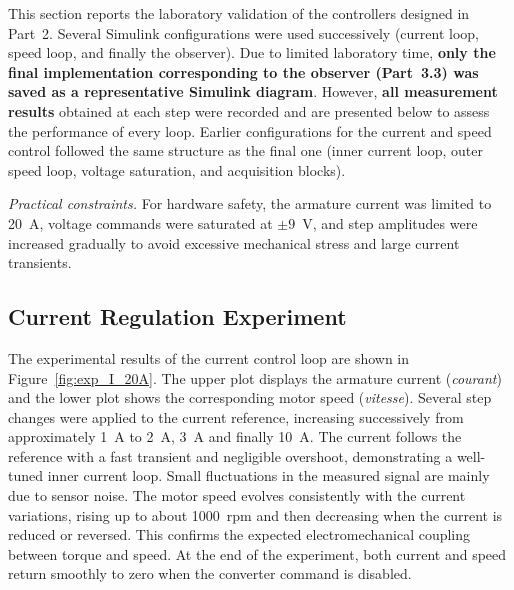 \documentclass{rapportCS}
\begin{document}
\label{sec:exp}

This section reports the laboratory validation of the controllers designed in Part~2. 
Several Simulink configurations were used successively (current loop, speed loop, and finally the observer). 
Due to limited laboratory time, \textbf{only the final implementation corresponding to the observer (Part~3.3) was saved as a representative Simulink diagram}. 
However, \textbf{all measurement results} obtained at each step were recorded and are presented below to assess the performance of every loop. 
Earlier configurations for the current and speed control followed the same structure as the final one (inner current loop, outer speed loop, voltage saturation, and acquisition blocks).

\vspace{4pt}
\noindent\textit{Practical constraints.} For hardware safety, the armature current was limited to 20~A, voltage commands were saturated at $\pm9$~V, and step amplitudes were increased gradually to avoid excessive mechanical stress and large current transients.

\subsection{Current Regulation Experiment}

The experimental results of the current control loop are shown in Figure~\ref{fig:exp_I_20A}. 
The upper plot displays the armature current (\textit{courant}) and the lower plot shows the corresponding motor speed (\textit{vitesse}). 
Several step changes were applied to the current reference, increasing successively from approximately 1~A to 2~A, 3~A and finally 10~A. 
The current follows the reference with a fast transient and negligible overshoot, demonstrating a well-tuned inner current loop. 
Small fluctuations in the measured signal are mainly due to sensor noise. 
The motor speed evolves consistently with the current variations, rising up to about 1000~rpm and then decreasing when the current is reduced or reversed. 
This confirms the expected electromechanical coupling between torque and speed. 
At the end of the experiment, both current and speed return smoothly to zero when the converter command is disabled.
\end{document}
